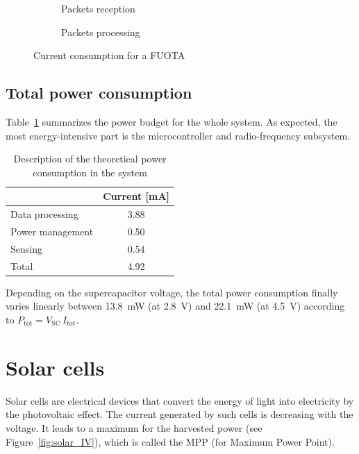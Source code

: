 \documentclass{EPL-master-thesis-covers-EN}
\newcommand{\te}[1]{\textrm{#1}}
\begin{document}
\begin{figure}[H]
\begin{subfigure}{.49\textwidth}
  \centering
  
  \caption{Packets reception}
\end{subfigure}
\begin{subfigure}{.49\textwidth}
  \centering
   
  \caption{Packets processing}
\end{subfigure}
\caption{Current consumption for a FUOTA}
\label{fig:current_consumption_MCU_RF_FUOTA}
\end{figure}


\subsection*{Total power consumption}

Table~\ref{tab:power_consumption_theor} summarizes the power budget for the whole system. As expected, the most energy-intensive part is the microcontroller and radio-frequency subsystem.


\begin{table}[H]
\centering
\begin{tabular}{lc}
\toprule
                     & Current [\si{mA}] \\ \midrule
 Data processing     & 3.88              \\
 Power management    & 0.50              \\
 Sensing             & 0.54              \\ \midrule
 Total               & 4.92              \\ \bottomrule
\end{tabular}
\caption{Description of the theoretical power consumption in the system}
\label{tab:power_consumption_theor}
\end{table}

Depending on the supercapacitor voltage, the total power consumption finally varies linearly between \SI{13.8}{mW} (at \SI{2.8}{V}) and \SI{22.1}{mW} (at \SI{4.5}{V}) according to $P_\te{tot} = V_\te{SC} \, I_\te{tot}$.


\section{Solar cells}
\label{section:solar_cells}

Solar cells are electrical devices that convert the energy of light into electricity by the photovoltaic effect. The current generated by such cells is decreasing with the voltage. It leads to a maximum for the harvested power (see Figure~\ref{fig:solar_IV}), which is called the MPP (for Maximum Power Point).
\end{document}
